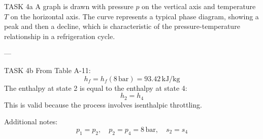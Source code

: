 TASK 4a  
A graph is drawn with pressure \( p \) on the vertical axis and temperature \( T \) on the horizontal axis. The curve represents a typical phase diagram, showing a peak and then a decline, which is characteristic of the pressure-temperature relationship in a refrigeration cycle.

---

TASK 4b  
From Table A-11:  
\[
h_f = h_f(8 \, \text{bar}) = 93.42 \, \text{kJ/kg}
\]  
The enthalpy at state 2 is equal to the enthalpy at state 4:  
\[
h_2 = h_4
\]  
This is valid because the process involves isenthalpic throttling.  

Additional notes:  
\[
p_1 = p_2, \quad p_2 = p_4 = 8 \, \text{bar}, \quad s_2 = s_4
\]